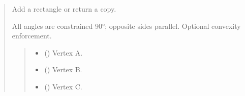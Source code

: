 \documentclass[letterpaper,10pt,english]{sphinxmanual}
\begin{document}
\begin{quote}
\begin{fulllineitems}
\begin{fulllineitems}
\begin{quote}
\begin{description}
\end{description}\end{quote}

\end{fulllineitems}


\begin{fulllineitems}
\label{\detokenize{pygeox:pygeox.add_objects.AddNamespace.rectangle}}
\pysigstartsignatures
\pysiglinewithargsret
{}
{\sphinxparamcomma {}\sphinxparamcomma {}\sphinxparamcomma {}\sphinxparamcomma {}\sphinxparamcomma {}\sphinxparamcomma {}}
{}
\pysigstopsignatures
\sphinxAtStartPar
Add a rectangle or return a copy.

\sphinxAtStartPar
All angles are constrained 90°; opposite sides parallel. Optional
convexity enforcement.
\begin{quote}\begin{description}
\begin{itemize}
\item {} 
\sphinxAtStartPar
{} (\sphinxstyleliteralemphasis{\sphinxupquote{ | }}) \textendash{} Vertex A.

\item {} 
\sphinxAtStartPar
{} (\sphinxstyleliteralemphasis{\sphinxupquote{ | }}) \textendash{} Vertex B.

\item {} 
\sphinxAtStartPar
{} (\sphinxstyleliteralemphasis{\sphinxupquote{ | }}) \textendash{} Vertex C.


\end{itemize}
\end{description}
\end{quote}
\end{fulllineitems}
\end{fulllineitems}
\end{quote}
\end{document}
